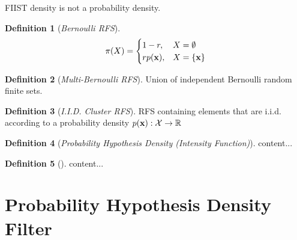 \documentclass[a4paper]{scrreprt}
\theoremstyle{theorem}
\theoremstyle{definition}
\newtheorem{defn}{Definition}
\begin{document}
FIIST density is not a probability density.

\begin{defn}[\emph{Bernoulli RFS}]
\begin{equation}\label{eq:bernoulli_rfs}
	\pi(X) = 
	\begin{cases}
	1 - r, 			& X = \emptyset \\
	r p(\stVar), 	& X = \Bqty{\stVar}
	\end{cases}
\end{equation}
\end{defn}

\begin{defn}[\emph{Multi-Bernoulli RFS}]
	Union of independent Bernoulli random finite sets.
\end{defn}

\begin{defn}[\emph{I.I.D. Cluster RFS}]
	RFS containing elements that are i.i.d. according to a probability density \( p(\stVar): \stSp\to\R \)
\end{defn}

\begin{defn}[\emph{Probability Hypothesis Density (Intensity Function)}]
	content...
\end{defn}

\begin{defn}[]
	content...
\end{defn}



\section{Probability Hypothesis Density Filter}





\end{document}
